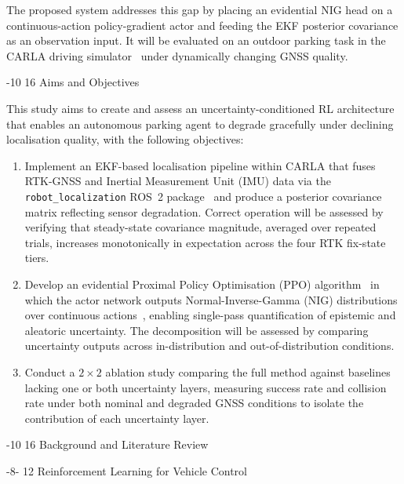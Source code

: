 \documentclass{sig-alternate}
\makeatletter
\renewcommand\section{\@startsection{section}{1}{\z@}%
    {-10\p@ \@plus -4\p@ \@minus -2\p@}%
    {16\p@}%
    {\baselineskip 14pt\secfnt\@ucheadtrue}}
\renewcommand\subsection{\@startsection{subsection}{2}{\z@}%
    {-8\p@ \@plus -2\p@ \@minus -\p@}%
    {12\p@}%
    {\secfnt}}
\makeatother
\begin{document}
The proposed system addresses this gap by placing an evidential NIG head on a continuous-action policy-gradient actor and feeding the EKF posterior covariance as an observation input. It will be evaluated on an outdoor parking task in the CARLA driving simulator~\cite{dosovitskiy2017carla} under dynamically changing GNSS quality.

\section{Aims and Objectives}
\label{sec:aims}

This study aims to create and assess an uncertainty-conditioned RL architecture that enables an autonomous parking agent to degrade gracefully under declining localisation quality, with the following objectives:

\begin{enumerate}
    \item Implement an EKF-based localisation pipeline within CARLA that fuses RTK-GNSS and Inertial Measurement Unit (IMU) data via the \texttt{robot\_localization} ROS~2 package~\cite{moore2014ekf} and produce a posterior covariance matrix reflecting sensor degradation. Correct operation will be assessed by verifying that steady-state covariance magnitude, averaged over repeated trials, increases monotonically in expectation across the four RTK fix-state tiers.
    \item Develop an evidential Proximal Policy Optimisation (PPO) algorithm~\cite{schulman2017ppo} in which the actor network outputs Normal-Inverse-Gamma (NIG) distributions over continuous actions~\cite{amini2020deep}, enabling single-pass quantification of epistemic and aleatoric uncertainty. The decomposition will be assessed by comparing uncertainty outputs across in-distribution and out-of-distribution conditions.
    \item Conduct a $2 \times 2$ ablation study comparing the full method against baselines lacking one or both uncertainty layers, measuring success rate and collision rate under both nominal and degraded GNSS conditions to isolate the contribution of each uncertainty layer.
\end{enumerate}

\section{Background and Literature Review}
\label{sec:background}

\subsection{Reinforcement Learning for Vehicle Control}
\end{document}
